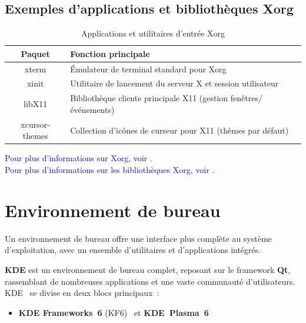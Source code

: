 \subsection*{Exemples d'applications et bibliothèques Xorg}

\begin{table}[H]
    \centering
    \begin{tabular}{|c|p{8cm}|}
        \hline
        \textbf{Paquet}  & \textbf{Fonction principale} \\
        \hline
        xterm & Émulateur de terminal standard pour Xorg \\
        \hline
        xinit  & Utilitaire de lancement du serveur X et session utilisateur \\
        \hline
        libX11  & Bibliothèque cliente principale X11 (gestion fenêtres/événements) \\
        \hline
        xcursor-themes & Collection d'icônes de curseur pour X11 (thèmes par défaut) \\
        \hline
    \end{tabular}
    \caption{Applications et utilitaires d'entrée Xorg}
    \label{tab:xorg-apps}
\end{table}

\textcolor{blue}{Pour plus d’informations sur Xorg, voir \cite{doc_xorg}.}\\
\textcolor{blue}{Pour plus d’informations sur les bibliothèques Xorg, voir \cite{bibliotheques_xorg}.}

\section{Environnement de bureau}
\label{subsec:desktop-env}


Un environnement de bureau offre une interface plus complète au système d’exploitation, avec un ensemble d’utilitaires et d’applications intégrés.

\textbf{KDE} est un environnement de bureau complet, reposant sur le framework \textbf{Qt}, rassemblant de nombreuses applications et une vaste communauté d’utilisateurs.\\
 KDE  se divise en deux blocs principaux :  
\begin{itemize}
  \item \textbf{KDE Frameworks 6} (KF6)   et \textbf{KDE Plasma 6} 
  
\end{itemize}



